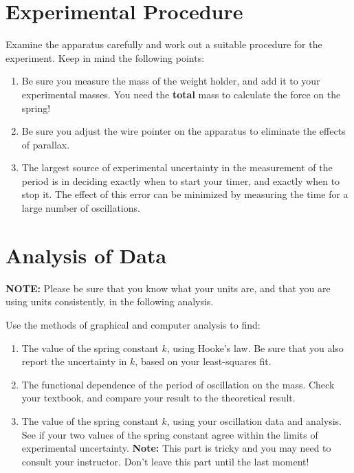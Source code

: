 \section*{Experimental Procedure}
     Examine the apparatus carefully and work out a suitable 
procedure for the experiment.  Keep in mind the following points:
\begin{enumerate}
\item Be sure you measure the mass of the weight holder, and add
it to your experimental masses.  You need the {\bf total} mass to
calculate the force on the spring!

\item Be sure you adjust the wire pointer on the apparatus to 
         eliminate the effects of parallax.
\item The largest source of experimental uncertainty in the 
         measurement of the period is in deciding exactly when to 
         start your timer, and exactly when to stop it.  The 
         effect of this error can be minimized by measuring the 
         time for a large number of oscillations.
\end{enumerate}
    
\section*{Analysis of Data}
     {\bf NOTE:}  Please be sure that you know what your units are, and
     that you are using units consistently, in the following
     analysis.

     Use the methods of graphical and computer analysis to find:
\begin{enumerate}     
\item The value of the spring constant $k$, using Hooke's law.  Be sure
that you also report the uncertainty in $k$, based on your least-squares
fit.

\item The functional dependence of the period of oscillation 
         on the mass.  Check your textbook, and compare your
	   result to the theoretical result. 
 
\item The value of the spring constant $k$, using your 
         oscillation data and analysis.  See if your two values 
         of the spring constant agree within the limits of 
         experimental uncertainty.  {\bf Note:}  This part is tricky
	   and you may need to consult your instructor.  Don't leave this
	   part until the last moment!
\end{enumerate}

